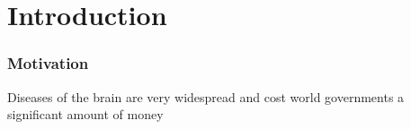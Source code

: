 
\section{Introduction}

\subsubsection{Motivation}

Diseases of the brain are very widespread and cost world governments a significant amount of money \cite{who}

